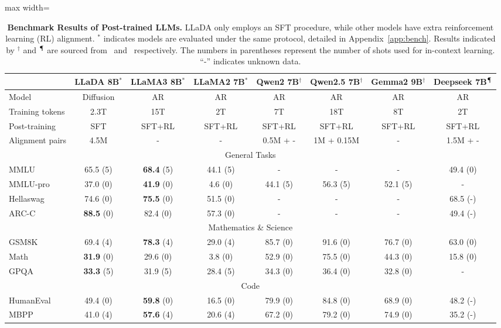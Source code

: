 \documentclass{article}
\begin{document}
 \begin{table}[t!]
    \centering
    \caption{\textbf{Benchmark Results of Post-trained LLMs.} LLaDA only employs an SFT procedure, while other models have extra reinforcement learning (RL) alignment.  $^{*}$ indicates models are evaluated under the same protocol, detailed in Appendix~\ref{app:bench}. Results indicated by $^{\dagger}$ and  $^{\mathparagraph}$ are sourced from~\citet{qwen2.5} and~\citet{bi2024deepseek} respectively. The numbers in parentheses represent the number of shots used for in-context learning. ``-'' indicates unknown data.}
    \label{tab:chat}
    \vspace{.2cm}
    \begin{adjustbox}{max width=\textwidth}
    \begin{tabular}{l|ccc|cccc}
      \toprule
  & LLaDA 8B$^{*}$ & LLaMA3 8B$^{*}$ & LLaMA2 7B$^{*}$ &  Qwen2 7B$^{\dagger}$ & Qwen2.5 7B$^{\dagger}$ & Gemma2 9B$^{\dagger}$ & Deepseek 7B$^{\mathparagraph}$  \\
      \midrule
Model & Diffusion & AR & AR & AR & AR & AR & AR \\
      Training tokens & 2.3T & 15T & 2T & 7T & 18T & 8T & 2T \\
      \midrule
      Post-training & SFT & SFT+RL & SFT+RL &SFT+RL &SFT+RL &SFT+RL &SFT+RL \\
      Alignment pairs & 4.5M & - & - & 0.5M + - & 1M + 0.15M & - & 1.5M + -\\
      \midrule
         \multicolumn{8}{c}{General Tasks}\\
      \midrule
          MMLU & 65.5 (5)  & \textbf{68.4} (5) & 44.1 (5) & - & - & - & 49.4 (0) \\
          MMLU-pro & 37.0 (0) & \textbf{41.9} (0) & 4.6 (0) & 44.1 (5) & 56.3 (5) & 52.1 (5) & - \\
          Hellaswag & 74.6 (0) & \textbf{75.5} (0) & 51.5 (0) & - & - & - & 68.5 (-)\\
       ARC-C & \textbf{88.5} (0) & 82.4 (0) & 57.3 (0) & - & - & - & 49.4 (-) \\
      \midrule
        \multicolumn{8}{c}{Mathematics \& Science}\\
      \midrule
        GSM8K & 69.4 (4) & \textbf{78.3} (4) & 29.0 (4) & 85.7 (0) & 91.6 (0) & 76.7 (0) & 63.0 (0)\\
        Math & \textbf{31.9} (0) & 29.6 (0) & 3.8 (0) & 52.9 (0) & 75.5 (0) & 44.3 (0) & 15.8 (0)\\
        GPQA & \textbf{33.3} (5) & 31.9 (5) & 28.4 (5) & 34.3 (0) & 36.4 (0) & 32.8 (0) & -\\
      \midrule
        \multicolumn{8}{c}{Code} \\
      \midrule
        HumanEval & 49.4 (0) & \textbf{59.8} (0) & 16.5 (0) & 79.9 (0) & 84.8 (0) & 68.9 (0) & 48.2 (-) \\     
        MBPP & 41.0 (4) & \textbf{57.6} (4) & 20.6 (4) & 67.2 (0) & 79.2 (0) & 74.9 (0) & 35.2 (-)\\
      \bottomrule
    \end{tabular}
    \end{adjustbox}
\end{table}
\end{document}
